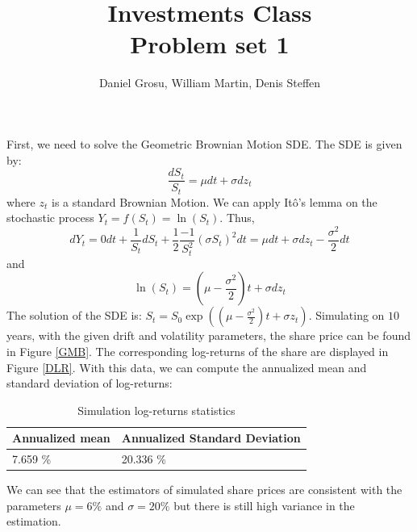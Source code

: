 \documentclass[10pt]{article}
\newenvironment{exercise}[2][Exercise]{\begin{trivlist}
  \item[\hskip \labelsep {\bfseries #1}\hskip \labelsep {\bfseries #2.}]}{\end{trivlist}}
\begin{document}
	
  \renewcommand{\qedsymbol}{\smiley}
	\title{Investments Class \\ Problem set 1}
	\author{Daniel Grosu, William Martin, Denis Steffen}
	
	\maketitle

  \begin{exercise}{1}
    First, we need to solve the Geometric Brownian Motion SDE. 
    The SDE is given by: 
    $$ \frac{dS_t}{S_t} = \mu dt + \sigma dz_t$$ where $z_t$ is a standard Brownian Motion. 
    We can apply Itô's lemma on the stochastic process $Y_t = f(S_t) = \ln(S_t)$.
    Thus, $$ dY_t = 0 dt +  \frac{1}{S_t}dS_t + \frac{1}{2}\frac{-1}{S_t^2}(\sigma S_t)^2 dt = \mu dt + \sigma dz_t - \frac{\sigma^2}{2}dt$$
    and $$ \ln(S_t) = (\mu-\frac{\sigma^2}{2})t + \sigma dz_t$$
    The solution of the SDE is: $ S_t = S_0 \exp((\mu-\frac{\sigma^2}{2})t+ \sigma z_t)$.
    Simulating on $10$ years, with the given drift and volatility parameters, the share price can be found in Figure \ref{GMB}. The corresponding log-returns of the share are displayed in Figure \ref{DLR}.
    With this data, we can compute the annualized mean and standard deviation of log-returns:
    
    \begin{table}[H]
      \centering
        \begin{tabular}{|l|l|}
        \hline
        Annualized mean & Annualized Standard Deviation \\ \hline
        7.659 \%        & 20.336 \%                    \\ \hline
        \end{tabular}
        \caption{Simulation log-returns statistics}
      \end{table}
      We can see that the estimators of simulated share prices are consistent with the parameters $\mu = 6\%$ and $\sigma = 20\%$ but there is still high variance in the estimation. 


\end{exercise}
\end{document}
